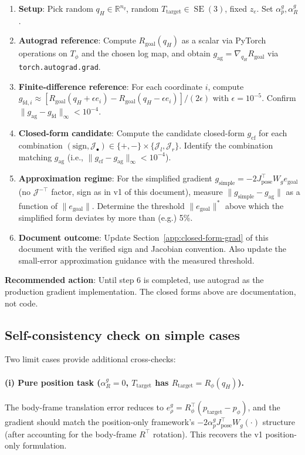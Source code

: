 \documentclass[11pt,a4paper]{article}
\DeclareMathOperator{\SE}{SE}
\newcommand{\R}{\mathbb{R}}
\newcommand{\Tphi}{T_\phi}
\newcommand{\Jpose}{J_{\text{pose}}}
\begin{document}
\begin{enumerate}[leftmargin=*]
    \item \textbf{Setup}: Pick random $q_H \in \R^{n_q}$, random $T_{\text{target}} \in \SE(3)$, fixed $z_e$. Set $\alpha_p^g, \alpha_R^g$.
    \item \textbf{Autograd reference}: Compute $R_{\text{goal}}(q_H)$ as a scalar via PyTorch operations on $\Tphi$ and the chosen log map, and obtain $g_{\text{ag}} = \nabla_{q_H} R_{\text{goal}}$ via \texttt{torch.autograd.grad}.
    \item \textbf{Finite-difference reference}: For each coordinate $i$, compute
    $g_{\text{fd}, i} \approx [R_{\text{goal}}(q_H + \epsilon e_i) - R_{\text{goal}}(q_H - \epsilon e_i)] / (2 \epsilon)$
    with $\epsilon = 10^{-5}$. Confirm $\| g_{\text{ag}} - g_{\text{fd}} \|_\infty < 10^{-4}$.
    \item \textbf{Closed-form candidate}: Compute the candidate closed-form $g_{\text{cf}}$ for each combination $(\text{sign}, \mathcal{J}_\bullet) \in \{+, -\} \times \{\mathcal{J}_l, \mathcal{J}_r\}$. Identify the combination matching $g_{\text{ag}}$ (i.e., $\| g_{\text{cf}} - g_{\text{ag}} \|_\infty < 10^{-4}$).
    \item \textbf{Approximation regime}: For the simplified gradient $g_{\text{simple}} = -2 \Jpose^\top W_g e_{\text{goal}}$ (no $\mathcal{J}^{-\top}$ factor, sign as in v1 of this document), measure $\| g_{\text{simple}} - g_{\text{ag}} \|$ as a function of $\| e_{\text{goal}} \|$. Determine the threshold $\| e_{\text{goal}} \|^*$ above which the simplified form deviates by more than (e.g.) 5\%.
    \item \textbf{Document outcome}: Update Section~\ref{app:closed-form-grad} of this document with the verified sign and Jacobian convention. Also update the small-error approximation guidance with the measured threshold.
\end{enumerate}

\textbf{Recommended action}: Until step 6 is completed, use autograd as the production gradient implementation. The closed forms above are documentation, not code.

\subsection{Self-consistency check on simple cases}

Two limit cases provide additional cross-checks:

\paragraph{(i) Pure position task ($\alpha_R^g = 0$, $T_{\text{target}}$ has $R_{\text{target}} = R_\phi(q_H)$).} The body-frame translation error reduces to $e_\rho^g = R_\phi^\top (p_\text{target} - p_\phi)$, and the gradient should match the position-only framework's $-2 \alpha_p^g \Jpose^\top W_g (\cdot)$ structure (after accounting for the body-frame $R^\top$ rotation). This recovers the v1 position-only formulation.
\end{document}
